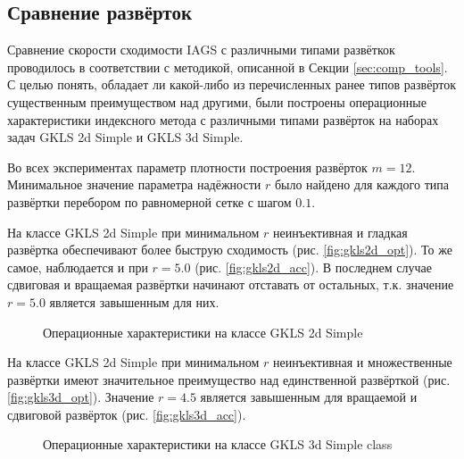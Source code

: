 \subsection{Сравнение развёрток}
\label{sec:seq_comp}
Сравнение скорости сходимости IAGS с различными типами развёткок проводилось в соответствии с методикой, описанной в
Секции \ref{sec:comp_tools}. С целью понять, обладает ли какой-либо из перечисленных ранее типов развёрток существенным преимуществом над другими,
были построены операционные характеристики индексного метода с различными типами развёрток на наборах задач GKLS 2d Simple и GKLS 3d Simple.

Во всех экспериментах параметр плотности построения развёрток $m=12$. Минимальное значение параметра надёжности \(r\) было найдено
для каждого типа развёртки перебором по равномерной сетке с шагом \(0.1\).

На классе GKLS 2d Simple при минимальном \(r\) неинъективная и гладкая развёртка обеспечивают более быструю сходимость
(рис. \ref{fig:gkls2d_opt}). То же самое, наблюдается и при \(r=5.0\) (рис. \ref{fig:gkls2d_acc}). В последнем случае сдвиговая и
вращаемая развёртки начинают отставать от остальных, т.к. значение \(r=5.0\) является завышенным для них.
\begin{figure}[ht]
    \centering
    \caption{Операционные характеристики на классе GKLS 2d Simple}
\end{figure}

На классе GKLS 2d Simple при минимальном \(r\) неинъективная и множественные развёртки имеют значительное
преимущество над единственной развёрткой (рис. \ref{fig:gkls3d_opt}). Значение \(r=4.5\) является завышенным для
вращаемой и сдвиговой развёрток (рис. \ref{fig:gkls3d_acc}).

\begin{figure}[ht]
    \centering
    \caption{Операционные характеристики на классе GKLS 3d Simple class}
\end{figure}

